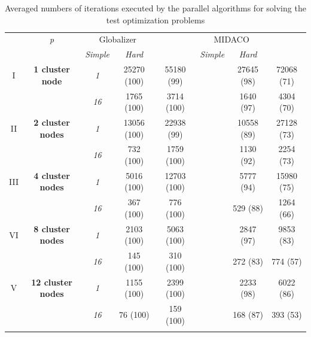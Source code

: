 \documentclass{svproc}
\begin{document}
\begin{table}
  \centering
  \caption{Averaged numbers of iterations executed by the parallel algorithms for solving the test
optimization problems}
  \label{tab:iterations}
  \begin{tabular}{cccccccc}
    \cline{3-8}\noalign{\smallskip}
    \multicolumn{2}{c}{  } & \textit{p} & \multicolumn{2}{c}{Globalizer} & &
\multicolumn{2}{c}{MIDACO}   \\
    \noalign{\smallskip} \cline{4-5} \cline{7-8}  \noalign{\smallskip}
    \multicolumn{2}{c}{  } & & \textit{Simple} & \textit{Hard} & & \textit{Simple} &
\textit{Hard}  \\
    \noalign{\smallskip}\hline
    I & \textbf{1 cluster node}
      & \textit{1} &   25270 (100)  & 55180 (99) & & 27645 (98) & 72068 (71)  \\
    &  & \textit{16} & 1765 (100)  & 3714 (100) & &  1640 (97) & 4304 (70) \\
    \hline \noalign{\smallskip}
II  & \textbf{2 cluster nodes}  %
  & \textit{1} & 13056 (100) & 22938 (99) & & 10558 (89) & 27128 (73) \\
&   & \textit{16} & 732 (100) & 1759 (100)  &  & 1130 (92) & 2254 (73) \\
    \hline \noalign{\smallskip}
III & \textbf{4 cluster nodes} %
  & \textit{1}  & 5016 (100) & 12703 (100) & & 5777 (94) & 15980 (75) \\
& & \textit{16} & 367 (100) & 776 (100) & & 529 (88) &  1264 (66) \\
    \hline \noalign{\smallskip}
VI & \textbf{8 cluster nodes} %
  & \textit{1}  & 2103 (100) & 5063 (100) & & 2847 (97) & 9853 (83)\\
& & \textit{16} & 145 (100)  & 310 (100)  & & 272 (83) & 774 (57)\\
    \hline \noalign{\smallskip}
V & \textbf{12 cluster nodes} %
  & \textit{1}  & 1155 (100) & 2399 (100) & & 2233 (98) & 6022 (86) \\
& & \textit{16} & 76 (100)  & 159 (100)  & & 168 (87) & 393 (53)\\
    \noalign{\smallskip}\hline
  \end{tabular}
\end{table}
\end{document}
